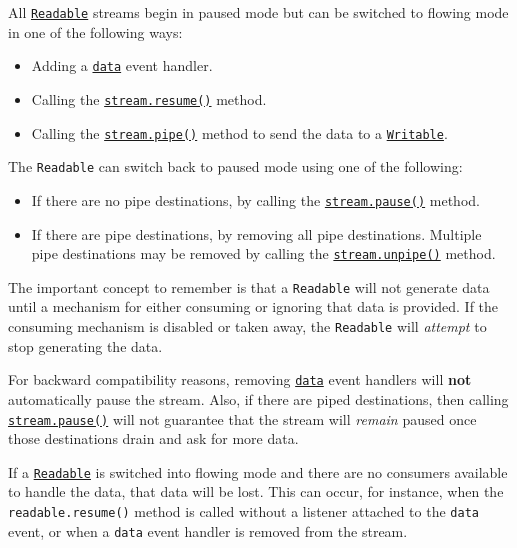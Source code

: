 All \hyperref[class-streamreadable]{\texttt{Readable}} streams begin in
paused mode but can be switched to flowing mode in one of the following
ways:

\begin{itemize}
\tightlist
\item
  Adding a
  \hyperref[event-data]{\texttt{\textquotesingle{}data\textquotesingle{}}}
  event handler.
\item
  Calling the \hyperref[readableresume]{\texttt{stream.resume()}}
  method.
\item
  Calling the
  \hyperref[readablepipedestination-options]{\texttt{stream.pipe()}}
  method to send the data to a
  \hyperref[class-streamwritable]{\texttt{Writable}}.
\end{itemize}

The \texttt{Readable} can switch back to paused mode using one of the
following:

\begin{itemize}
\tightlist
\item
  If there are no pipe destinations, by calling the
  \hyperref[readablepause]{\texttt{stream.pause()}} method.
\item
  If there are pipe destinations, by removing all pipe destinations.
  Multiple pipe destinations may be removed by calling the
  \hyperref[readableunpipedestination]{\texttt{stream.unpipe()}} method.
\end{itemize}

The important concept to remember is that a \texttt{Readable} will not
generate data until a mechanism for either consuming or ignoring that
data is provided. If the consuming mechanism is disabled or taken away,
the \texttt{Readable} will \emph{attempt} to stop generating the data.

For backward compatibility reasons, removing
\hyperref[event-data]{\texttt{\textquotesingle{}data\textquotesingle{}}}
event handlers will \textbf{not} automatically pause the stream. Also,
if there are piped destinations, then calling
\hyperref[readablepause]{\texttt{stream.pause()}} will not guarantee
that the stream will \emph{remain} paused once those destinations drain
and ask for more data.

If a \hyperref[class-streamreadable]{\texttt{Readable}} is switched into
flowing mode and there are no consumers available to handle the data,
that data will be lost. This can occur, for instance, when the
\texttt{readable.resume()} method is called without a listener attached
to the \texttt{\textquotesingle{}data\textquotesingle{}} event, or when
a \texttt{\textquotesingle{}data\textquotesingle{}} event handler is
removed from the stream.

